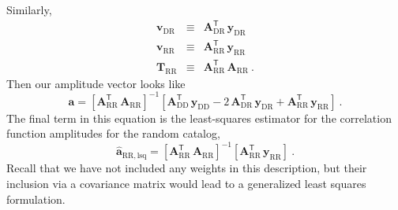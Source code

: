\documentclass[modern]{aastex62}
\newcommand{\inv}{^{-1}}
\newcommand{\T}{^{\mathsf{T}}}
\newcommand{\bld}[1]{\bm{#1}}
\newcommand{\vv}[1]{\bld{v}_\mathrm{#1}}
\newcommand{\TT}[1]{\bld{T}_\mathrm{#1}}
\begin{document}
Similarly, 
\begin{eqnarray}
    \vv{DR} &\equiv& \bld{A}_{\mathrm{DR}}\T\,\bld{y}_\mathrm{DR} \\
    \vv{RR} &\equiv& \bld{A}_{\mathrm{RR}}\T\,\bld{y}_\mathrm{RR} \\
    \TT{RR} &\equiv& \bld{A}_{\mathrm{RR}}\T\,\bld{A}_{\mathrm{RR}} ~.
\end{eqnarray}
Then our amplitude vector looks like
\begin{equation}
    \bld{a} = [\bld{A}_{\mathrm{RR}}\T \, \bld{A}_{\mathrm{RR}}]\inv [\bld{A}_{\mathrm{DD}}\T\,\bld{y}_\mathrm{DD} - 2\,\bld{A}_{\mathrm{DR}}\T\,\bld{y}_\mathrm{DR} + \bld{A}_{\mathrm{RR}}\T\,\bld{y}_\mathrm{RR}] ~.
\end{equation}
The final term in this equation is the least-squares estimator for the correlation function amplitudes for the random catalog,
\begin{equation}
    \bld{\hat{a}}_{\mathrm{RR,lsq}} = [\bld{A}_{\mathrm{RR}}\T \, \bld{A}_{\mathrm{RR}}]\inv [\bld{A}_{\mathrm{RR}}\T\,\bld{y}_\mathrm{RR}] ~.
\end{equation}
Recall that we have not included any weights in this description, but their inclusion via a covariance matrix would lead to a generalized least squares formulation.
\end{document}
